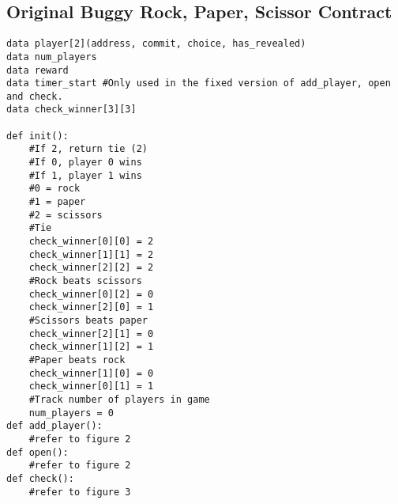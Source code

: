 \documentclass[10pt,twocolumn,letterpaper]{article}
\newcommand{\ignore}[1]{}
\begin{document}
\ignore{
Given the version at the end of this section, our contract is \textit{almost} incentive compatible. Only one party needs to call the $check()$ function in order for the winnings to be fairly distributed to the actual winner, regardless of who calls. This requires one player to spend gas to check to see who won, while the other player doesn't need to spend any gas. There is currently no way to require two people to spend equal amount of gas to call one function. How could this affect the incentives of the contract? \\

In the next section we will look at how the current block number and the amount of blocks that have arrived previously affect the security of a contract. We will look to alter our contract further so that if someone doesn't open (verify) their rock/paper/scissors commitments within a given timeframe (i.e. 5 blocks after they are added to the contract), then the contract would send the money to the person who \textit{did} verify their input by the deadline. This incentivizes both users to verify their inputs before the $check()$ function is called after a random amount of blocks have been published. If you don't reveal your commitment, then you are \textit{guaranteed} to lose.
}


\subsection{Original Buggy Rock, Paper, Scissor Contract}

\begin{mdframed}
\begin{verbatim}
data player[2](address, commit, choice, has_revealed)
data num_players
data reward
data timer_start #Only used in the fixed version of add_player, open and check.
data check_winner[3][3]

def init():
	#If 2, return tie (2)
	#If 0, player 0 wins
	#If 1, player 1 wins
	#0 = rock
	#1 = paper
	#2 = scissors
	#Tie
	check_winner[0][0] = 2
	check_winner[1][1] = 2
	check_winner[2][2] = 2
	#Rock beats scissors
	check_winner[0][2] = 0
	check_winner[2][0] = 1
	#Scissors beats paper
	check_winner[2][1] = 0
	check_winner[1][2] = 1
	#Paper beats rock
	check_winner[1][0] = 0
	check_winner[0][1] = 1
	#Track number of players in game
	num_players = 0
def add_player():
	#refer to figure 2
def open():
	#refer to figure 2
def check():
	#refer to figure 3
\end{verbatim}
\end{mdframed}
\end{document}

